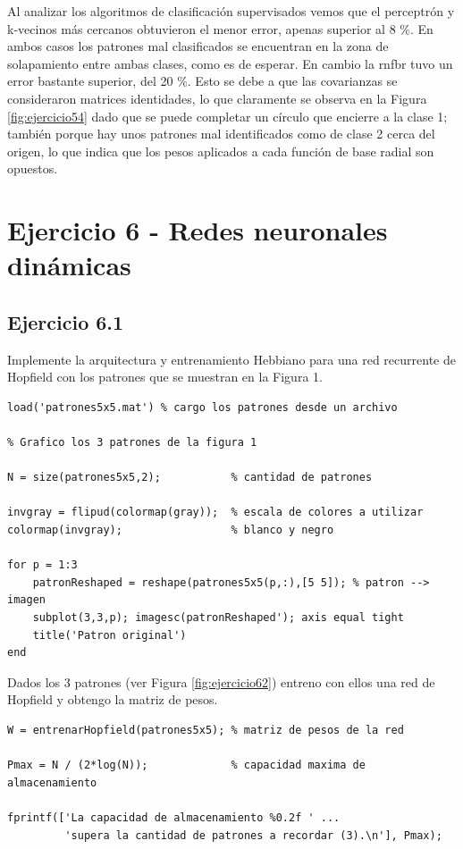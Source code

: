 \documentclass[11pt,a4paper,final]{article}
\begin{document}
Al analizar los algoritmos de clasificación supervisados vemos que el perceptrón y k-vecinos más cercanos obtuvieron el menor error, apenas superior al 8 \%. En ambos casos los patrones mal clasificados se encuentran en la zona de solapamiento entre ambas clases, como es de esperar. En cambio la rnfbr tuvo un error bastante superior, del 20 \%. Esto se debe a que las covarianzas se consideraron matrices identidades, lo que claramente se observa en la Figura \ref{fig:ejercicio54} dado que se puede completar un círculo que encierre a la clase 1; también porque hay unos patrones mal identificados como de clase 2 cerca del origen, lo que indica que los pesos aplicados a cada función de base radial son opuestos.









\clearpage

\section{Ejercicio 6 - Redes neuronales dinámicas}

\subsection{Ejercicio 6.1}

Implemente la arquitectura y entrenamiento Hebbiano para una red recurrente de Hopfield con los patrones que se muestran en la Figura 1.

\begin{verbatim}
load('patrones5x5.mat') % cargo los patrones desde un archivo

% Grafico los 3 patrones de la figura 1

N = size(patrones5x5,2);           % cantidad de patrones

invgray = flipud(colormap(gray));  % escala de colores a utilizar
colormap(invgray);                 % blanco y negro

for p = 1:3
    patronReshaped = reshape(patrones5x5(p,:),[5 5]); % patron --> imagen
    subplot(3,3,p); imagesc(patronReshaped'); axis equal tight
    title('Patron original')
end
\end{verbatim}

Dados los 3 patrones (ver Figura \ref{fig:ejercicio62}) entreno con ellos una red de Hopfield y obtengo la matriz de pesos.

\begin{verbatim}
W = entrenarHopfield(patrones5x5); % matriz de pesos de la red

Pmax = N / (2*log(N));             % capacidad maxima de almacenamiento

fprintf(['La capacidad de almacenamiento %0.2f ' ...
         'supera la cantidad de patrones a recordar (3).\n'], Pmax);
\end{verbatim}
\end{document}

